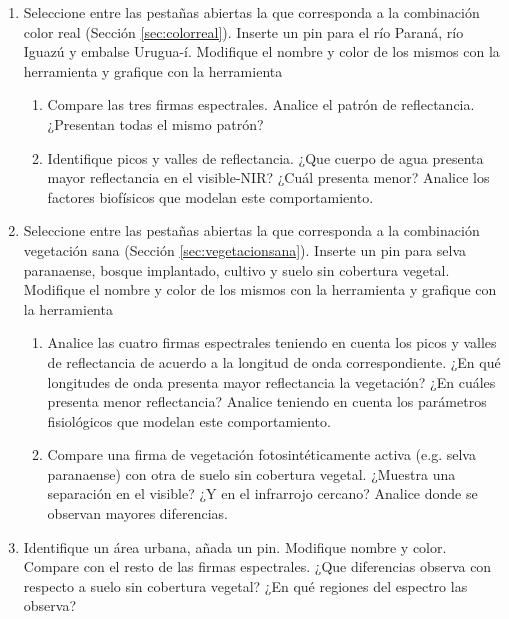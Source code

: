 \begin{enumerate}
  \item Seleccione entre las pestañas abiertas la que corresponda a la combinación color real (Sección \ref{sec:colorreal}). Inserte un pin para el río Paraná, río Iguazú y embalse Urugua-í. Modifique el nombre y color de los mismos con la herramienta  y grafique con la herramienta 
  \begin{enumerate}
      \item Compare las tres firmas espectrales. Analice el patrón de reflectancia. ¿Presentan todas el mismo patrón?
      \item Identifique picos y valles de reflectancia. ¿Que cuerpo de agua presenta mayor reflectancia en el visible-NIR? ¿Cuál presenta menor? Analice los factores biofísicos que modelan este comportamiento.
    \end{enumerate}

  \item Seleccione entre las pestañas abiertas la que corresponda a la combinación vegetación sana (Sección \ref{sec:vegetacionsana}). Inserte un pin para selva paranaense, bosque implantado, cultivo y suelo sin cobertura vegetal. Modifique el nombre y color de los mismos con la herramienta  y grafique con la herramienta 
  \begin{enumerate}
    \item Analice las cuatro firmas espectrales teniendo en cuenta los picos y valles de reflectancia de acuerdo a la longitud de onda correspondiente. ¿En qué longitudes de onda presenta mayor reflectancia la vegetación? ¿En cuáles presenta menor reflectancia? Analice teniendo en cuenta los parámetros fisiológicos que modelan este comportamiento.
    \item Compare una firma de vegetación fotosintéticamente activa (e.g. selva paranaense) con otra de suelo sin cobertura vegetal. ¿Muestra una separación en el visible? ¿Y en el infrarrojo cercano? Analice donde se observan mayores diferencias.
  \end{enumerate}
	\item Identifique un área urbana, añada un pin. Modifique nombre y color. Compare con el resto de las firmas espectrales. ¿Que diferencias observa con respecto a suelo sin cobertura vegetal? ¿En qué regiones del espectro las observa?
  \end{enumerate}

